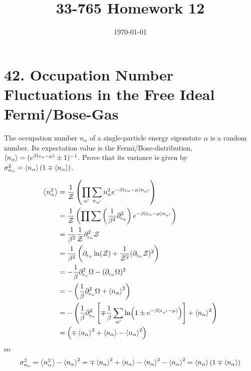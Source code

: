 \documentclass[a4paper,twoside]{article}
\title{33-765 Homework 12}
\date{\today}
\begin{document}
\maketitle

\section*{42. Occupation Number Fluctuations in the Free Ideal Fermi/Bose-Gas}
The occupation number $ n_{\alpha} $ of a single-particle energy eigenstate $ \alpha $ is a random number. Its expectation value is the Fermi/Bose-distribution, $ \ev{n_{\alpha}} = (e^{\beta (\epsilon_{\alpha} - \mu)} \pm 1)^{-1} $. Prove that its variance is given by $ \sigma^2_{n_{\alpha}} = \ev{n_{\alpha}} (1 \mp \ev{n_{\alpha}}) $.
\begin{problem}
    \begin{align}
        \ev{n_{\alpha}^2} &= \frac{1}{\mathcal{Z}} \left( \prod_{\alpha'} \sum_{n_{\alpha'}} n^2_{\alpha} e^{- \beta(\epsilon_{\alpha} - \mu) n_{\alpha'}} \right) \\
        &= \frac{1}{\mathcal{Z}} \left( \prod \sum \left( \frac{1}{\beta^2} \partial^2_{\epsilon_{\alpha}} \right) e^{- \beta(\epsilon_{\alpha} - \mu) n_{\alpha'}} \right) \\
        &= \frac{1}{\beta^2} \frac{1}{\mathcal{Z}} \partial^2_{\epsilon_{\alpha}} \mathcal{Z} \\
        &= \frac{1}{\beta^2} \left( \partial_{\epsilon_{\alpha}} \ln(\mathcal{Z}) + \frac{1}{\mathcal{Z}^2} (\partial_{\epsilon_{\alpha}} \mathcal{Z})^2 \right) \\
        &= - \frac{1}{\beta} \partial_{\epsilon_{\alpha}}^2 \Omega - (\partial_{\epsilon_{\alpha}} \Omega)^2 \\
        &= - \left( \frac{1}{\beta} \partial_{\epsilon_{\alpha}}^2 \Omega + \ev{n_{\alpha}}^2 \right) \\
        &= - \left( \frac{1}{\beta} \partial^2_{\epsilon_{\alpha}} \left[ \mp \frac{1}{\beta} \sum_{\alpha'} \ln(1\pm e^{- \beta(\epsilon_{\alpha'} - \mu)}) \right] + \ev{n_{\alpha}}^2\right) \\
        &= \left( \mp \ev{n_{\alpha}}^2 + \ev{n_{\alpha}} - \ev{n_{\alpha}}^2 \right)
    \end{align}
    so
    \begin{equation}
        \sigma^2_{n_{\alpha}} = \ev{n_{\alpha}^2} - \ev{n_{\alpha}}^2 = \mp \ev{n_{\alpha}}^2 + \ev{n_{\alpha}} - \ev{n_{\alpha}}^2 - \ev{n_{\alpha}}^2 = \ev{n_{\alpha}} (1 \mp \ev{n_{\alpha}})
    \end{equation}
\end{problem}
\end{document}
